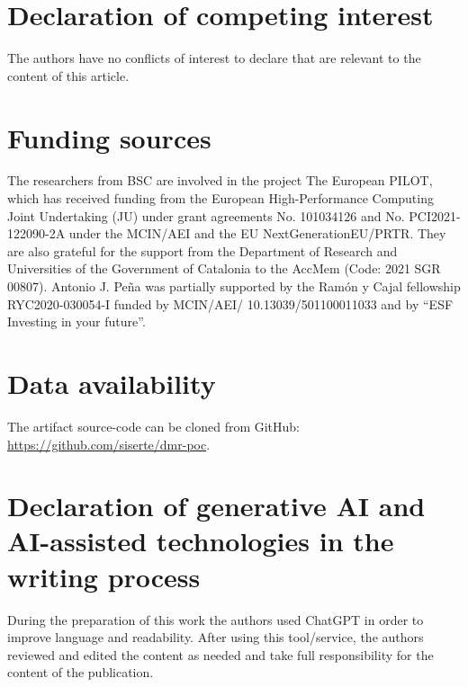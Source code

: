 \documentclass[a4paper,fleqn]{cas-dc}
\begin{document}
\section*{Declaration of competing interest}
The authors have no conflicts of interest to declare that are relevant to the content of this article.

\section*{Funding sources}
The researchers from BSC are involved in the project The European PILOT, which has received funding from the European High-Performance Computing Joint Undertaking (JU) under grant agreements No. 101034126 and No. PCI2021-122090-2A under the MCIN/AEI and the EU NextGenerationEU/PRTR.
They are also grateful for the support from the Department of Research and Universities of the Government of Catalonia to the AccMem (Code: 2021 SGR 00807).
Antonio J. Peña was partially supported by the Ramón y Cajal fellowship RYC2020-030054-I funded by MCIN/AEI/ 10.13039/501100011033 and by ``ESF Investing in your future''.

\section*{Data availability}
The artifact source-code can be cloned from GitHub: \url{https://github.com/siserte/dmr-poc}.

\section*{Declaration of generative AI and AI-assisted technologies in the writing process}
During the preparation of this work the authors used ChatGPT in order to improve language and readability. After using this tool/service, the authors reviewed and edited the content as needed and take full responsibility for the content of the publication.





\end{document}

